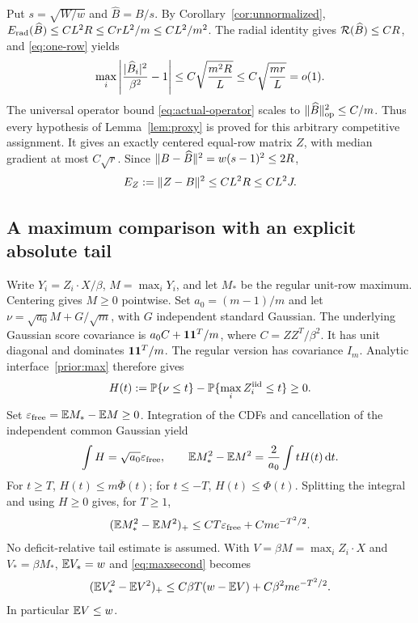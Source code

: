 Put $s=\sqrt{W/w}$ and $\widehat B=B/s$. By
Corollary~\ref{cor:unnormalized},
$E_{\rm rad}(\widehat B)\le CL^2R\le CrL^2/m\le CL^2/m^2$.
The radial identity gives $\mathcal R(\widehat B)\le CR$, and
\eqref{eq:one-row} yields
\[
 \max_i\left|\frac{\lvert \widehat B_i\rvert^2}{\beta^2}-1\right|
           \le C\sqrt{\frac{m^2R}{L}}
           \le C\sqrt{\frac{mr}{L}}=o(1).
\]
The universal operator bound \eqref{eq:actual-operator} scales to
$\lVert \widehat B\rVert_{\rm op}^2\le C/m$. Thus every hypothesis of
Lemma~\ref{lem:proxy} is proved for this arbitrary competitive assignment.
It gives an exactly centered equal-row matrix $Z$, with median gradient
at most $C\sqrt r$.
Since $\lVert B-\widehat B\rVert^2=w(s-1)^2\le2R$,
\begin{equation}\label{eq:proxyerror}
              E_Z:=\lVert Z-B\rVert^2\le CL^2R\le CL^2J.
\end{equation}

\subsection{A maximum comparison with an explicit absolute tail}
Write $Y_i=Z_i\cdot X/\beta$, $M=\max_iY_i$, and let $M_*$ be the
regular unit-row maximum. Centering gives $M\ge0$ pointwise.
Set $a_0=(m-1)/m$ and let
$\nu=\sqrt{a_0}M+G/\sqrt m$, with $G$ independent standard Gaussian.
The underlying Gaussian score covariance is
$a_0C+\mathbf 1\mathbf 1^T/m$, where $C=ZZ^T/\beta^2$.
It has unit diagonal and dominates $\mathbf 1\mathbf 1^T/m$. The regular version
has covariance $I_m$. Analytic interface~\ref{prior:max} therefore gives
\[
 H(t):=\mathbb P\{\nu\le t\}-\mathbb P\{\max_iZ_i^{\rm iid}\le t\}\ge0.
\]
Set $\varepsilon_{\rm free}=\mathbb E M_*-\mathbb E M\ge0$. Integration of the CDFs
and cancellation of the independent common Gaussian yield
\[
 \int H=\sqrt{a_0}\varepsilon_{\rm free},\qquad
 \mathbb E M_*^2-\mathbb E M^2=\frac2{a_0}\int tH(t)\,\mathrm d t.
\]
For $t\ge T$, $H(t)\le m\overline\Phi(t)$; for $t\le-T$,
$H(t)\le\Phi(t)$. Splitting the integral and using $H\ge0$ gives,
for $T\ge1$,
\begin{equation}\label{eq:maxsecond}
       (\mathbb E M_*^2-\mathbb E M^2)_+
           \le CT\varepsilon_{\rm free}+Cm e^{-T^2/2}.
\end{equation}
No deficit-relative tail estimate is assumed.
With $V=\beta M=\max_i Z_i\cdot X$ and $V_*=\beta M_*$,
$\mathbb E V_*=w$ and \eqref{eq:maxsecond} becomes
\begin{equation}\label{eq:scaledmax}
 (\mathbb E V_*^2-\mathbb E V^2)_+
       \le C\beta T(w-\mathbb E V)+C\beta^2m e^{-T^2/2}.
\end{equation}
In particular $\mathbb E V\le w$.

